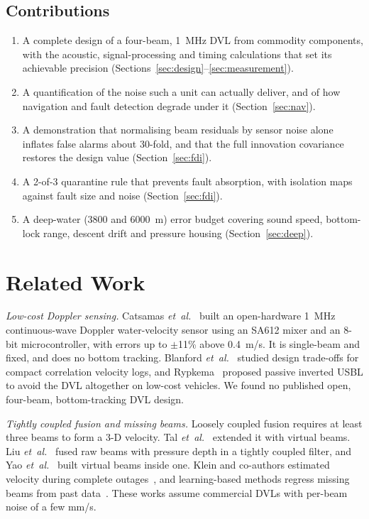 \documentclass[conference]{IEEEtran}
\begin{document}
\subsection{Contributions}
\begin{enumerate}
\item A complete design of a four-beam, 1~MHz DVL from commodity components, with the acoustic, signal-processing and timing calculations that set its achievable precision (Sections~\ref{sec:design}--\ref{sec:measurement}).
\item A quantification of the noise such a unit can actually deliver, and of how navigation and fault detection degrade under it (Section~\ref{sec:nav}).
\item A demonstration that normalising beam residuals by sensor noise alone inflates false alarms about 30-fold, and that the full innovation covariance restores the design value (Section~\ref{sec:fdi}).
\item A 2-of-3 quarantine rule that prevents fault absorption, with isolation maps against fault size and noise (Section~\ref{sec:fdi}).
\item A deep-water (3800 and 6000~m) error budget covering sound speed, bottom-lock range, descent drift and pressure housing (Section~\ref{sec:deep}).
\end{enumerate}

\section{Related Work}

\emph{Low-cost Doppler sensing.} Catsamas \emph{et~al.}~\cite{catsamas2022} built an open-hardware 1~MHz continuous-wave Doppler water-velocity sensor using an SA612 mixer and an 8-bit microcontroller, with errors up to $\pm$11\% above 0.4~m/s. It is single-beam and fixed, and does no bottom tracking. Blanford \emph{et~al.}~\cite{blanford2018} studied design trade-offs for compact correlation velocity logs, and Rypkema~\cite{rypkema2019} proposed passive inverted USBL to avoid the DVL altogether on low-cost vehicles. We found no published open, four-beam, bottom-tracking DVL design.

\emph{Tightly coupled fusion and missing beams.} Loosely coupled fusion requires at least three beams to form a 3-D velocity. Tal \emph{et~al.}~\cite{tal2017} extended it with virtual beams. Liu \emph{et~al.}~\cite{liu2018} fused raw beams with pressure depth in a tightly coupled filter, and Yao \emph{et~al.}~\cite{yao2023} built virtual beams inside one. Klein and co-authors estimated velocity during complete outages~\cite{klein2020,klein2022}, and learning-based methods regress missing beams from past data~\cite{yona2023,cohen2024}. These works assume commercial DVLs with per-beam noise of a few mm/s.
\end{document}
